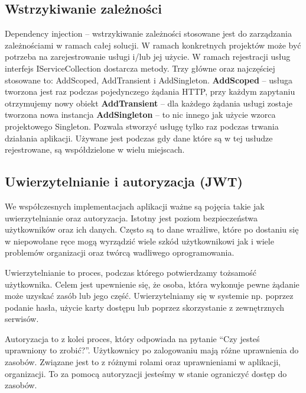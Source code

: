 \documentclass[a4paper,twoside,12pt]{book}
\begin{document}
\subsection{Wstrzykiwanie zależności}
Dependency injection – wstrzykiwanie zależności stosowane jest do zarządzania zależnościami w ramach całej solucji. W ramach konkretnych projektów może być potrzeba na zarejestrowanie usługi i/lub jej użycie. W ramach rejestracji usług interfejs IServiceCollection dostarcza metody. Trzy główne oraz najczęściej stosowane to: AddScoped, AddTransient i AddSingleton. 
\textbf{AddScoped} -- usługa tworzona jest raz podczas pojedynczego żądania HTTP, przy każdym zapytaniu otrzymujemy nowy obiekt 
\textbf{AddTransient} -- dla każdego żądania usługi zostaje tworzona nowa instancja 
\textbf{AddSingleton} -- to nic innego jak użycie wzorca projektowego Singleton. Pozwala stworzyć usługę tylko raz podczas trwania działania aplikacji. Używane jest podczas gdy dane które są w tej usłudze rejestrowane, są współdzielone w wielu miejscach. 


\subsection{Uwierzytelnianie i autoryzacja (JWT)}
We współczesnych implementacjach aplikacji ważne są pojęcia takie jak uwierzytelnianie oraz autoryzacja. Istotny jest poziom bezpieczeństwa użytkowników oraz ich danych. Często są to dane wrażliwe, które po dostaniu się w niepowołane ręce mogą wyrządzić wiele szkód użytkownikowi jak i wiele problemów organizacji oraz twórcą wadliwego oprogramowania. 

Uwierzytelnianie to proces, podczas którego potwierdzamy tożsamość użytkownika. Celem jest upewnienie się, że osoba, która wykonuje pewne żądanie może uzyskać zasób lub jego część. Uwierzytelniamy się w systemie np. poprzez podanie hasła, użycie karty dostępu lub poprzez skorzystanie z zewnętrznych serwisów. 

Autoryzacja to z kolei proces, który odpowiada na pytanie “Czy jesteś uprawniony to zrobić?”. Użytkownicy po zalogowaniu mają różne uprawnienia do zasobów. Związane jest to z różnymi rolami oraz uprawnieniami w aplikacji, organizacji. To za pomocą autoryzacji jesteśmy w stanie ograniczyć dostęp do zasobów. 
\end{document}
